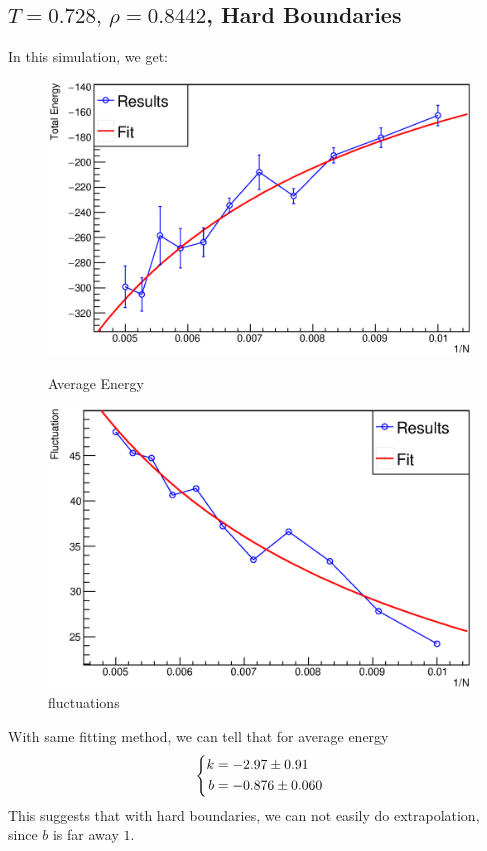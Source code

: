 \documentclass[UTF8,a4paper]{article}
\begin{document}
\subsection{$T =0.728,\, \rho = 0.8442$, Hard Boundaries}
In this simulation, we get:
\begin{figure}[H]
	\centering
	\begin{minipage}[t]{0.45\textwidth}
		\centering
		\includegraphics[height=0.2\textheight]{Root Fit/fit_exp1_h.eps}
		\caption{Average Energy}
	\end{minipage}\hspace{0.5cm}
	\begin{minipage}[t]{0.45\textwidth}
		\centering
		\includegraphics[height=0.2\textheight]{Root Fit/fit_exp1_flu_h.eps}
		\caption{fluctuations}
	\end{minipage}
\end{figure}
With same fitting method, we can tell that for average energy
\begin{equation}
	\left\{
		\begin{aligned}
			k &= \num[separate-uncertainty = true]{-2.97+-0.91}\\
			b &= \num[separate-uncertainty = true]{-0.876+-0.06}
		\end{aligned}
	\right.
\end{equation}
This suggests that with hard boundaries, we can not easily do extrapolation, since $b$ is far away $1$.
\end{document}
